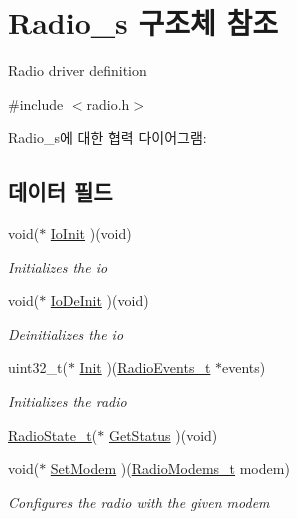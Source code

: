 \hypertarget{struct_radio__s}{}\section{Radio\+\_\+s 구조체 참조}
\label{struct_radio__s}


Radio driver definition  




{\ttfamily \#include $<$radio.\+h$>$}



Radio\+\_\+s에 대한 협력 다이어그램\+:
\subsection*{데이터 필드}
\begin{DoxyCompactItemize}
\item 
void($\ast$ \mbox{\hyperlink{struct_radio__s_a83cf0df693579d453bad2d5b7d5565ed}{Io\+Init}} )(void)
\begin{DoxyCompactList}\small\item\em Initializes the io \end{DoxyCompactList}\item 
void($\ast$ \mbox{\hyperlink{struct_radio__s_ad96e15c082765bd1e893b4a5e6c39f8c}{Io\+De\+Init}} )(void)
\begin{DoxyCompactList}\small\item\em Deinitializes the io \end{DoxyCompactList}\item 
uint32\+\_\+t($\ast$ \mbox{\hyperlink{struct_radio__s_a976a50280beda4c9dd58b8354affb6b4}{Init}} )(\mbox{\hyperlink{struct_radio_events__t}{Radio\+Events\+\_\+t}} $\ast$events)
\begin{DoxyCompactList}\small\item\em Initializes the radio \end{DoxyCompactList}\item 
\mbox{\hyperlink{radio_8h_a2f3fa4ad0237c4ace94aa99086aac9f5}{Radio\+State\+\_\+t}}($\ast$ \mbox{\hyperlink{struct_radio__s_a8d469520cd62ec3004a50fcaa31d8c72}{Get\+Status}} )(void)
\item 
void($\ast$ \mbox{\hyperlink{struct_radio__s_a72519c61045a1c4dd51233ff0e374628}{Set\+Modem}} )(\mbox{\hyperlink{radio_8h_a992ef7a5b7f52975ba7bd8dd97740057}{Radio\+Modems\+\_\+t}} modem)
\begin{DoxyCompactList}\small\item\em Configures the radio with the given modem \end{DoxyCompactList}\item 

\end{DoxyCompactItemize}
